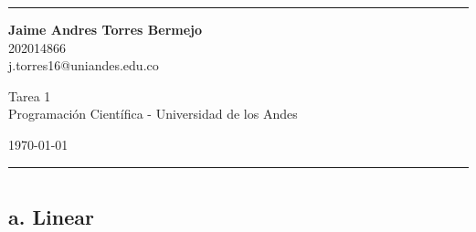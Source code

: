 \documentclass[a4paper]{article}
\begin{document}

\fancyhead[C]{}
\hrule \medskip %
\begin{minipage}{0.295\textwidth} 
\raggedright
\footnotesize
\textbf{Jaime Andres Torres Bermejo} \hfill\\   
202014866\hfill\\
j.torres16@uniandes.edu.co


\end{minipage}
\begin{minipage}{0.4\textwidth} 
\centering 
\large 
Tarea 1\\ 
\normalsize 
Programación Científica - Universidad de los Andes\\ 
\end{minipage}
\begin{minipage}{0.295\textwidth} 
\raggedleft
\today\hfill\\
\end{minipage}
\medskip\hrule 
\bigskip


\section{}
\subsection{}
\section{}
\subsection{a. Linear}
\end{document}
